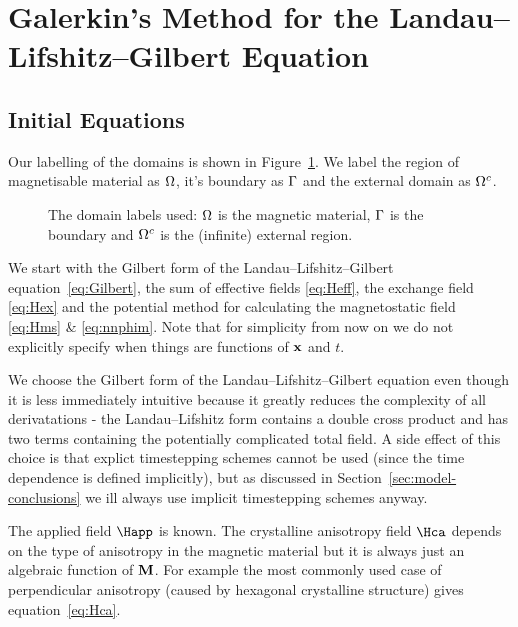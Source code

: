 \section{Galerkin's Method for the Landau--Lifshitz--Gilbert Equation}
\label{sec:galerk-meth-llg}

\subsection{Initial Equations}

Our labelling of the domains is shown in Figure~\ref{fig:domain_labels}. We label the region of magnetisable material as $\Omega$, it's boundary as ${\Gamma}$ and the external domain as ${\Omega^c}$.

\begin{figure}[!ht]
  \center
  \caption{The domain labels used: $\Omega$ is the magnetic material, ${\Gamma}$ is the boundary and ${\Omega^c}$ is the (infinite) external region.} \label{fig:domain_labels}
\end{figure}

We start with the Gilbert form of the Landau--Lifshitz--Gilbert equation~\eqref{eq:Gilbert}, the sum of effective fields \eqref{eq:Heff}, the exchange field \eqref{eq:Hex} and the potential method for calculating the magnetostatic field \eqref{eq:Hms} \& \eqref{eq:nnphim}. Note that for simplicity from now on we do not explicitly specify when things are functions of $\mathbf{x}$ and $t$.

We choose the Gilbert form of the Landau--Lifshitz--Gilbert equation even though it is less immediately intuitive because it greatly reduces the complexity of all derivatations - the Landau--Lifshitz form contains a double cross product and has two terms containing the potentially complicated total field. A side effect of this choice is that explict timestepping schemes cannot be used (since the time dependence is defined implicitly), but as discussed in Section~\ref{sec:model-conclusions} we ill always use implicit timestepping schemes anyway.

The applied field $\Happ$ is known. The crystalline anisotropy field $\Hca$ depends on the type of anisotropy in the magnetic material but it is always just an algebraic function of $\mathbf{M}$. For example the most commonly used case of perpendicular anisotropy (caused by hexagonal crystalline structure) gives equation~\eqref{eq:Hca}.

